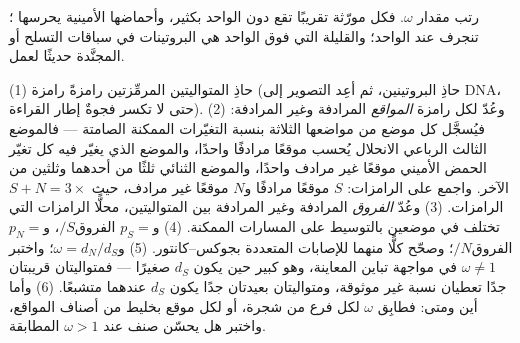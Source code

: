 \begin{omfigure}

{\small رتب مقدار $\omega$. فكل مورّثة تقريبًا تقع دون الواحد
بكثير، وأحماضها الأمينية يحرسها ؛  تنجرف عند الواحد؛ والقليلة التي فوق الواحد هي
البروتينات في سباقات التسلح أو المجنَّدة حديثًا لعمل.}
\end{omfigure}

\begin{method}\label{met:b3:molecular-evolution:method}
(1) حاذِ المتواليتين المرمِّزتين رامزةً رامزة (حاذِ
البروتينين، ثم أعِد التصوير إلى DNA، حتى لا تكسر فجوةٌ إطار
القراءة). (2) وعُدّ لكل رامزة \emph{المواقع} المرادفة وغير
المرادفة: فيُسجَّل كل موضع من مواضعها الثلاثة بنسبة
التغيّرات الممكنة الصامتة --- فالموضع الثالث الرباعي
الانحلال يُحسب موقعًا مرادفًا واحدًا، والموضع الذي يغيّر فيه
كل تغيّر الحمض الأميني موقعًا غير مرادف واحدًا، والموضع
الثنائي ثلثًا من أحدهما وثلثين من الآخر. واجمع على الرامزات:
$S$ موقعًا مرادفًا و$N$ موقعًا غير مرادف، حيث $S + N = 3 \times$ الرامزات.
(3) وعُدّ \emph{الفروق} المرادفة وغير المرادفة بين
المتواليتين، محلًّا الرامزات التي تختلف في موضعين بالتوسيط
على المسارات الممكنة. (4) و$p_{S} = $ الفروق$/S$، و$p_{N} = $ الفروق$/N$؛
وصحّح كلًّا منهما للإصابات المتعددة بجوكس--كانتور. (5) و$\omega =
d_{N}/d_{S}$؛ واختبر $\omega \ne 1$ في مواجهة تباين المعاينة، وهو
كبير حين يكون $d_{S}$ صغيرًا --- فمتواليتان قريبتان جدًا
تعطيان نسبة غير موثوقة، ومتواليتان بعيدتان جدًا يكون
$d_{S}$ عندهما متشبعًا. (6) وأما أين ومتى: فطابِق $\omega$ لكل
فرع من شجرة، أو لكل موقع بخليط من أصناف المواقع، واختبر هل
يحسّن صنف عند $\omega > 1$ المطابقة.
\end{method}


